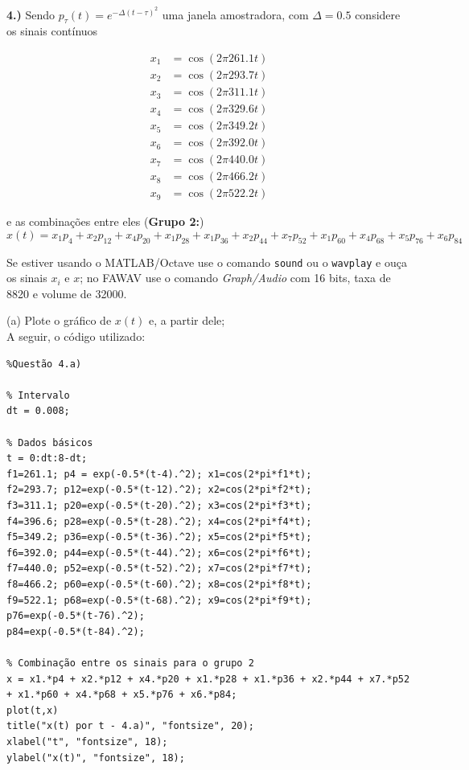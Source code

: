 \documentclass[10pt]{article}
\begin{document}
\vspace{\baselineskip}


\textbf{4.)} Sendo $p_{\tau}(t) = e^{-\Delta (t - \tau)^2}$ uma janela amostradora, com $\Delta = 0.5$ considere os sinais contínuos

\begin{flushleft}
\begin{align*}
    x_1 &= \cos(2 \pi 261.1 t)\\
    x_2 &= \cos(2 \pi 293.7 t)\\
    x_3 &= \cos(2 \pi 311.1 t)\\
    x_4 &= \cos(2 \pi 329.6 t)\\
    x_5 &= \cos(2 \pi 349.2 t)\\
    x_6 &= \cos(2 \pi 392.0 t)\\
    x_7 &= \cos(2 \pi 440.0 t)\\
    x_8 &= \cos(2 \pi 466.2 t)\\
    x_9 &= \cos(2 \pi 522.2 t)
\end{align*}
\end{flushleft}
e as combinações entre eles (\textbf{Grupo 2:})
\[x(t) = x_1p_4 + x_2p_{12} + x_4p_{20} + x_1p_{28} + x_1p_{36} + x_2p_{44} + x_7p_{52} + x_1p_{60} + x_4p_{68} + x_5p_{76} + x_6p_{84}\]

Se estiver usando o MATLAB/Octave use o comando \texttt{sound} ou o \texttt{wavplay} e ouça os sinais $x_i$ e $x$; no FAWAV use o comando \emph{Graph/Audio} com 16 bits, taxa de 8820 e volume de 32000.

(a) Plote o gráfico de $x(t)$ e, a partir dele;\\
A seguir, o código utilizado:

\begin{verbatim}
%Questão 4.a)

% Intervalo
dt = 0.008;

% Dados básicos
t = 0:dt:8-dt;
f1=261.1; p4 = exp(-0.5*(t-4).^2); x1=cos(2*pi*f1*t);
f2=293.7; p12=exp(-0.5*(t-12).^2); x2=cos(2*pi*f2*t);
f3=311.1; p20=exp(-0.5*(t-20).^2); x3=cos(2*pi*f3*t);
f4=396.6; p28=exp(-0.5*(t-28).^2); x4=cos(2*pi*f4*t);
f5=349.2; p36=exp(-0.5*(t-36).^2); x5=cos(2*pi*f5*t);
f6=392.0; p44=exp(-0.5*(t-44).^2); x6=cos(2*pi*f6*t);
f7=440.0; p52=exp(-0.5*(t-52).^2); x7=cos(2*pi*f7*t);
f8=466.2; p60=exp(-0.5*(t-60).^2); x8=cos(2*pi*f8*t);
f9=522.1; p68=exp(-0.5*(t-68).^2); x9=cos(2*pi*f9*t);
p76=exp(-0.5*(t-76).^2); 
p84=exp(-0.5*(t-84).^2);

% Combinação entre os sinais para o grupo 2
x = x1.*p4 + x2.*p12 + x4.*p20 + x1.*p28 + x1.*p36 + x2.*p44 + x7.*p52 + x1.*p60 + x4.*p68 + x5.*p76 + x6.*p84;
plot(t,x)
title("x(t) por t - 4.a)", "fontsize", 20);
xlabel("t", "fontsize", 18);
ylabel("x(t)", "fontsize", 18);



\end{verbatim}
\end{document}
